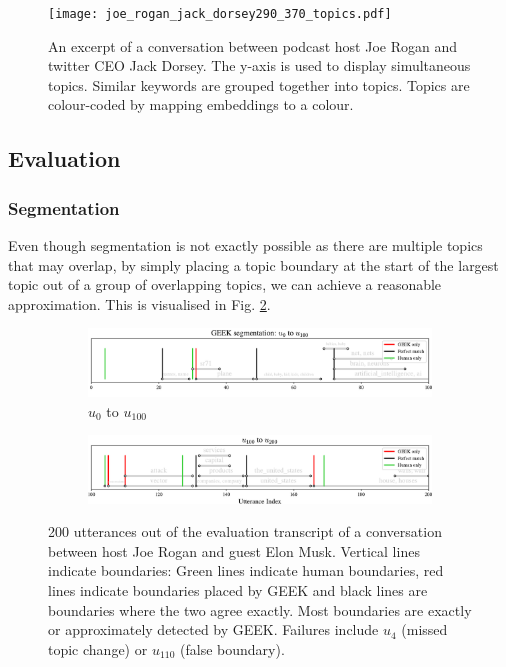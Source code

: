         \begin{figure}
            \centering
            \texttt{[image: joe\_rogan\_jack\_dorsey290\_370\_topics.pdf]}
            \caption{An excerpt of a conversation between podcast host Joe Rogan and twitter CEO Jack Dorsey. The y-axis is used to display simultaneous topics. Similar keywords are grouped together into topics. Topics are colour-coded by mapping embeddings to a colour.}
            \label{fig:GEEK final result}
        \end{figure}
    
    \subsection{Evaluation}
    
    \subsubsection{Segmentation}
        Even though segmentation is not exactly possible as there are multiple topics that may overlap, by simply placing a topic boundary at the start of the largest topic out of a group of overlapping topics, we can achieve a reasonable approximation. This is visualised in Fig. \ref{fig:GEEK segment}.
        \begin{figure}[h]
             \centering
             \begin{subfigure}[b]{\textwidth}
                 \centering
                 \includegraphics[width=1\textwidth]{figures/0to100segment_topics.pdf}
                 \caption{$u_0$ to $u_100$}
             \end{subfigure}
             \hfill
             \begin{subfigure}[b]{\textwidth}
                 \centering
                 \includegraphics[width=1\textwidth]{figures/100to200segment_topics.pdf}
             \end{subfigure}
                \caption{200 utterances out of the evaluation transcript of a conversation between host Joe Rogan and guest Elon Musk. Vertical lines indicate boundaries: Green lines indicate human boundaries, red lines indicate boundaries placed by GEEK and black lines are boundaries where the two agree exactly. Most boundaries are exactly or approximately detected by GEEK. Failures include $u_4$ (missed topic change) or $u_{110}$ (false boundary).}
                \label{fig:GEEK segment}
        \end{figure}
        
